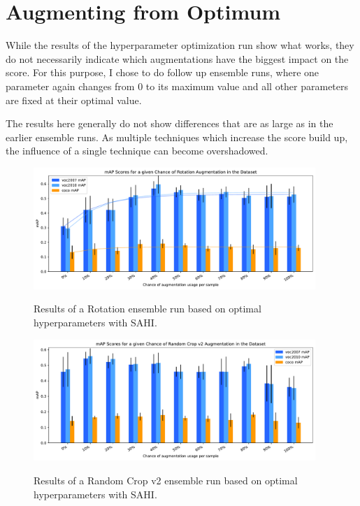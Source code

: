 \documentclass[10pt]{book}
\begin{document}
\section{Augmenting from Optimum}

While the results of the hyperparameter optimization run show what works, they do not necessarily indicate which augmentations have the biggest impact on the score. For this purpose, I chose to do follow up ensemble runs, where one parameter again changes from 0 to its maximum value and all other parameters are fixed at their optimal value.

The results here generally do not show differences that are as large as in the earlier ensemble runs. As multiple techniques which increase the score build up, the influence of a single technique can become overshadowed.

\begin{figure}
  \caption{Results of a Rotation ensemble run based on optimal hyperparameters with \ac{SAHI}.}
  \includegraphics[width=0.95\textwidth]{image/hyp-based-rot-sahi-ensemble-2-thesis}
  \label{fig:hyp_based_rot_plot}
\end{figure}

\begin{figure}
  \caption{Results of a Random Crop v2 ensemble run based on optimal hyperparameters with \ac{SAHI}.}
  \includegraphics[width=0.95\textwidth]{image/hyp-based-rc2-sahi-ensemble-2-thesis}
  \label{fig:hyp_based_rc2_plot}
\end{figure}
\end{document}
